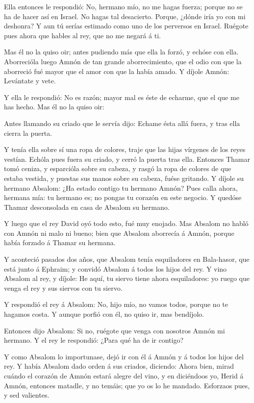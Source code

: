  Ella entonces le respondió: No, hermano mío, no me hagas
fuerza; porque no se ha de hacer así en Israel. No hagas tal desacierto.
 Porque, ¿dónde iría yo con mi deshonra? Y aun tú serías
estimado como uno de los perversos en Israel. Ruégote pues ahora que
hables al rey, que no me negará á ti.

 Mas él no la quiso oir; antes pudiendo más que ella la
forzó, y echóse con ella.  Aborrecióla luego Amnón de tan
grande aborrecimiento, que el odio con que la aborreció fué mayor que el
amor con que la había amado. Y díjole Amnón: Levántate y vete.

 Y ella le respondió: No es razón; mayor mal es éste de
echarme, que el que me has hecho. Mas él no la quiso oir:

 Antes llamando su criado que le servía dijo: Echame ésta
allá fuera, y tras ella cierra la puerta.

 Y tenía ella sobre sí una ropa de colores, traje que las
hijas vírgenes de los reyes vestían. Echóla pues fuera su criado, y
cerró la puerta tras ella.  Entonces Thamar tomó ceniza, y
esparcióla sobre su cabeza, y rasgó la ropa de colores de que estaba
vestida, y puestas sus manos sobre su cabeza, fuése gritando.
 Y díjole su hermano Absalom: ¿Ha estado contigo tu hermano
Amnón? Pues calla ahora, hermana mía: tu hermano es; no pongas tu
corazón en este negocio. Y quedóse Thamar desconsolada en casa de
Absalom su hermano.

 Y luego que el rey David oyó todo esto, fué muy enojado.
 Mas Absalom no habló con Amnón ni malo ni bueno; bien que
Absalom aborrecía á Amnón, porque había forzado á Thamar su hermana.

 Y aconteció pasados dos años, que Absalom tenía
esquiladores en Bala-hasor, que está junto á Ephraim; y convidó Absalom
á todos los hijos del rey.  Y vino Absalom al rey, y
díjole: He aquí, tu siervo tiene ahora esquiladores: yo ruego que venga
el rey y sus siervos con tu siervo.

 Y respondió el rey á Absalom: No, hijo mío, no vamos
todos, porque no te hagamos costa. Y aunque porfió con él, no quiso ir,
mas bendíjolo.

 Entonces dijo Absalom: Si no, ruégote que venga con
nosotros Amnón mi hermano. Y el rey le respondió: ¿Para qué ha de ir
contigo?

 Y como Absalom lo importunase, dejó ir con él á Amnón y á
todos los hijos del rey.  Y había Absalom dado orden á sus
criados, diciendo: Ahora bien, mirad cuándo el corazón de Amnón estará
alegre del vino, y en diciéndoos yo, Herid á Amnón, entonces matadle, y
no temáis; que yo os lo he mandado. Esforzaos pues, y sed valientes.

